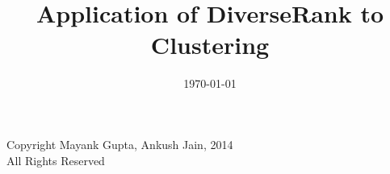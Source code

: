 \documentclass[a4paper, 11pt, oneside]{Thesis}  %
\begin{document}
\frontmatter	  %

\title  {Application of DiverseRank to Clustering}
\addresses  {\groupname\\\deptname\\\univname}  %
\date       {\today}
\subject    {}
\keywords   {}

\maketitle


\fancyhead{}  %
\rhead{\thepage}  %
\lhead{}  %

\pagestyle{fancy}  %

\pagestyle{empty}  %

\null\vfill
\begin{center}
	Copyright {\textcopyright} Mayank Gupta, Ankush Jain, 2014 \\
	All Rights Reserved \\
\end{center}

\end{document}
